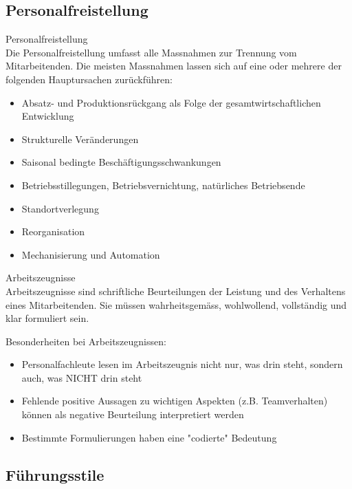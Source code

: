 \subsection{Personalfreistellung}

\begin{definition}{Personalfreistellung}\\
Die Personalfreistellung umfasst alle Massnahmen zur Trennung vom Mitarbeitenden. Die meisten Massnahmen lassen sich auf eine oder mehrere der folgenden Hauptursachen zurückführen:
\begin{itemize}
    \item Absatz- und Produktionsrückgang als Folge der gesamtwirtschaftlichen Entwicklung
    \item Strukturelle Veränderungen
    \item Saisonal bedingte Beschäftigungsschwankungen
    \item Betriebsstillegungen, Betriebsvernichtung, natürliches Betriebsende
    \item Standortverlegung
    \item Reorganisation
    \item Mechanisierung und Automation
\end{itemize}
\end{definition}

\begin{definition}{Arbeitszeugnisse}\\
Arbeitszeugnisse sind schriftliche Beurteilungen der Leistung und des Verhaltens eines Mitarbeitenden. Sie müssen wahrheitsgemäss, wohlwollend, vollständig und klar formuliert sein.

Besonderheiten bei Arbeitszeugnissen:
\begin{itemize}
    \item Personalfachleute lesen im Arbeitszeugnis nicht nur, was drin steht, sondern auch, was NICHT drin steht
    \item Fehlende positive Aussagen zu wichtigen Aspekten (z.B. Teamverhalten) können als negative Beurteilung interpretiert werden
    \item Bestimmte Formulierungen haben eine "codierte" Bedeutung
\end{itemize}
\end{definition}

\subsection{Führungsstile}

